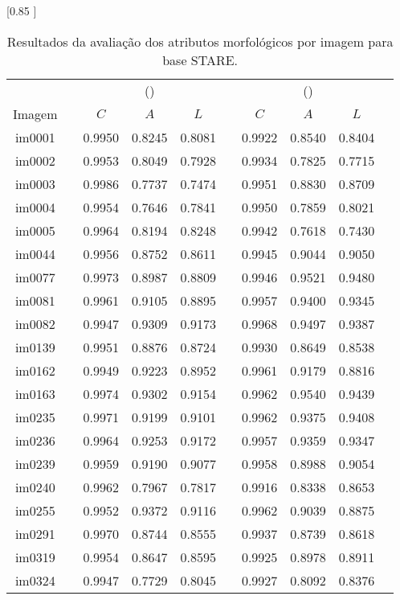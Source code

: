\begin{table}[h!] 
\caption{Resultados da avalia\c{c}\~{a}o dos atributos morfol\'ogicos por imagem para base STARE.} 
\label{tabAllQualSTARE} 
\centering 
\scalebox {0.85 }[0.85 ]{  
\begin{tabular}{cccccccccc}  
\toprule  
&  & \multicolumn{3}{c}{\citeauthor{Zana:2001} (\citeyear{Zana:2001})} &  & \multicolumn{3}{c}{\citeauthor{Soares:2006} (\citeyear{Soares:2006})} \\  
\cmidrule{3-5} \cmidrule{7-9}  
Imagem &  & $C$ & $A$ & $L$ & & $C$ & $A$ & $L$ \\  
\midrule  
im0001 &  & 0.9950 & 0.8245 & 0.8081 & & 0.9922 & 0.8540 & 0.8404  \\  
im0002 &  & 0.9953 & 0.8049 & 0.7928 & & 0.9934 & 0.7825 & 0.7715  \\  
im0003 &  & 0.9986 & 0.7737 & 0.7474 & & 0.9951 & 0.8830 & 0.8709  \\  
im0004 &  & 0.9954 & 0.7646 & 0.7841 & & 0.9950 & 0.7859 & 0.8021  \\  
im0005 &  & 0.9964 & 0.8194 & 0.8248 & & 0.9942 & 0.7618 & 0.7430  \\  
im0044 &  & 0.9956 & 0.8752 & 0.8611 & & 0.9945 & 0.9044 & 0.9050  \\  
im0077 &  & 0.9973 & 0.8987 & 0.8809 & & 0.9946 & 0.9521 & 0.9480  \\  
im0081 &  & 0.9961 & 0.9105 & 0.8895 & & 0.9957 & 0.9400 & 0.9345  \\  
im0082 &  & 0.9947 & 0.9309 & 0.9173 & & 0.9968 & 0.9497 & 0.9387  \\  
im0139 &  & 0.9951 & 0.8876 & 0.8724 & & 0.9930 & 0.8649 & 0.8538  \\  
im0162 &  & 0.9949 & 0.9223 & 0.8952 & & 0.9961 & 0.9179 & 0.8816  \\  
im0163 &  & 0.9974 & 0.9302 & 0.9154 & & 0.9962 & 0.9540 & 0.9439  \\  
im0235 &  & 0.9971 & 0.9199 & 0.9101 & & 0.9962 & 0.9375 & 0.9408  \\  
im0236 &  & 0.9964 & 0.9253 & 0.9172 & & 0.9957 & 0.9359 & 0.9347  \\  
im0239 &  & 0.9959 & 0.9190 & 0.9077 & & 0.9958 & 0.8988 & 0.9054  \\  
im0240 &  & 0.9962 & 0.7967 & 0.7817 & & 0.9916 & 0.8338 & 0.8653  \\  
im0255 &  & 0.9952 & 0.9372 & 0.9116 & & 0.9962 & 0.9039 & 0.8875  \\  
im0291 &  & 0.9970 & 0.8744 & 0.8555 & & 0.9937 & 0.8739 & 0.8618  \\  
im0319 &  & 0.9954 & 0.8647 & 0.8595 & & 0.9925 & 0.8978 & 0.8911  \\  
im0324 &  & 0.9947 & 0.7729 & 0.8045 & & 0.9927 & 0.8092 & 0.8376  \\  
\bottomrule  
\end{tabular}  
}  
\end{table}  

